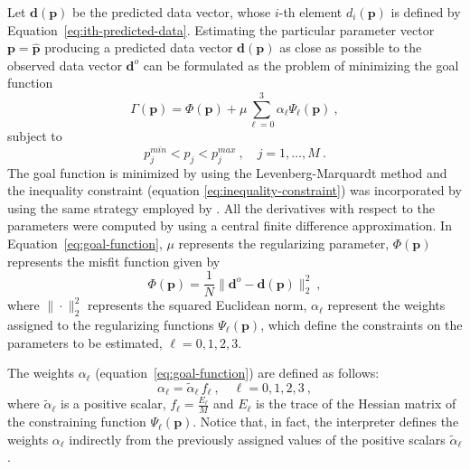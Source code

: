 \documentclass[manuscript]{geophysics}
\begin{document}
Let $\mathbf{d}(\mathbf{p})$ be the predicted data vector, whose $i$-th element
$d_{i}(\mathbf{p})$ is defined by Equation~\ref{eq:ith-predicted-data}. Estimating the
particular parameter vector $\mathbf{p} = \hat{\mathbf{p}}$ producing a predicted data
vector $\mathbf{d}(\mathbf{p})$ as close as possible to the observed data vector 
$\mathbf{d}^{o}$ can be formulated as the problem of minimizing the goal function
\begin{equation}
\Gamma (\mathbf{p}) = \Phi(\mathbf{p}) + \mu \sum_{\ell = 0}^{3} \alpha_{\ell}
\Psi_{\ell}(\mathbf{p}) \: ,
\label{eq:goal-function}
\end{equation}
subject to 
\begin{equation}
p_{j}^{min} < p_{j} < p_{j}^{max} \: , \quad j = 1, \dots, M \: .
\label{eq:inequality-constraint}
\end{equation}
The goal function is minimized by using the Levenberg-Marquardt method \citep{aster-etal2005}
and the inequality constraint (equation \ref{eq:inequality-constraint}) was
incorporated by using the same strategy employed by \citet{barbosa-etal1999}.
All the derivatives with respect to the parameters were computed by using a
central finite difference approximation.
In Equation~\ref{eq:goal-function}, $\mu$ represents the regularizing parameter, 
$\Phi(\mathbf{p})$ represents the misfit function given by
\begin{equation}
\Phi(\mathbf{p}) = \frac{1}{N} \| \mathbf{d}^{o} - \mathbf{d}(\mathbf{p}) \|_{2}^{2} 
\: , 
\label{eq:misfit-function}
\end{equation}
where $\| \cdot \|_{2}^{2}$ represents the squared Euclidean norm, $\alpha_{\ell}$
represent the weights assigned to the regularizing functions $\Psi_{\ell}(\mathbf{p})$,
which define the constraints on the parameters to be estimated, $\ell = 0, 1, 2, 3$.

The weights $\alpha_{\ell}$ (equation~\ref{eq:goal-function}) are defined as follows:
\begin{equation}
\alpha_{\ell} = \tilde{\alpha}_{\ell} \, f_{\ell} \: , \quad \ell = 0, 1, 2, 3 \: ,
\label{eq:constraint-weights}
\end{equation}
where $\tilde{\alpha}_{\ell}$ is a positive scalar, $f_{\ell} = \frac{E_{\ell}}{M}$ and
$E_{\ell}$ is the trace of the Hessian matrix of the constraining function
$\Psi_{\ell}(\mathbf{p})$. Notice that, in fact, the interpreter defines the
weights $\alpha_{\ell}$ indirectly from the previously assigned values of the 
positive scalars $\tilde{\alpha}_{\ell}$.
\end{document}
